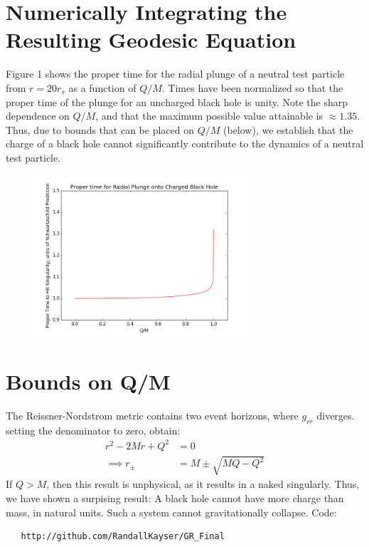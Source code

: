 \documentclass{article}
\begin{document}
\section{Numerically Integrating the Resulting Geodesic Equation}
Figure 1 shows the proper time for the radial plunge of a neutral test particle from $r = 20 r_s$ as a function of $Q/M$. Times have been normalized so that the proper time of the plunge for an uncharged black hole is unity. Note the sharp dependence on $Q/M$, and that the maximum possible value attainable is $\approx 1.35$. Thus, due to bounds that can be placed on $Q/M$ (below), we establish that the charge of a black hole cannot significantly contribute to the dynamics of a neutral test particle.

\begin{figure}
   \includegraphics[width=8cm]{Schwartzschild_Comparison.png}
\end{figure}

\section{Bounds on Q/M}
The Reissner-Nordstrom metric contains two event horizons, where $g_{rr}$ diverges.
setting the denominator to zero, obtain:
\begin{align*}
   r^2 - 2Mr + Q^2 &= 0 \\
   \implies r_{\pm} &= M \pm \sqrt{MQ - Q^2}
\end{align*}
If $Q > M$, then this result is unphysical, as it results in a naked singularly. Thus, we have shown a surpising result: A black hole cannot have more charge than mass, in natural units. Such a system cannot gravitationally collapse.
\vspace{10pt} Code:
\begin{verbatim}
   http://github.com/RandallKayser/GR_Final
\end{verbatim}
\end{document}
